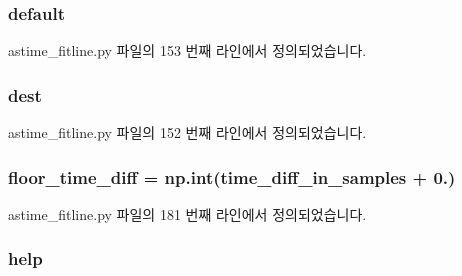 \subsubsection[{\texorpdfstring{default}{default}}]{\setlength{\rightskip}{0pt plus 5cm}default}\hypertarget{namespaceastime__fitline_affb1327b18bf08a379d19eef89cf1ed1}{}\label{namespaceastime__fitline_affb1327b18bf08a379d19eef89cf1ed1}


astime\+\_\+fitline.\+py 파일의 153 번째 라인에서 정의되었습니다.

\subsubsection[{\texorpdfstring{dest}{dest}}]{\setlength{\rightskip}{0pt plus 5cm}dest}\hypertarget{namespaceastime__fitline_ab0bede79c5f4cbed9c2cd932a0ace201}{}\label{namespaceastime__fitline_ab0bede79c5f4cbed9c2cd932a0ace201}


astime\+\_\+fitline.\+py 파일의 152 번째 라인에서 정의되었습니다.

\subsubsection[{\texorpdfstring{floor\+\_\+time\+\_\+diff}{floor_time_diff}}]{\setlength{\rightskip}{0pt plus 5cm}floor\+\_\+time\+\_\+diff = np.\+int({\bf time\+\_\+diff\+\_\+in\+\_\+samples} + 0.)}\hypertarget{namespaceastime__fitline_ab6f60fa8e275f766060bf2c45822113b}{}\label{namespaceastime__fitline_ab6f60fa8e275f766060bf2c45822113b}


astime\+\_\+fitline.\+py 파일의 181 번째 라인에서 정의되었습니다.

\subsubsection[{\texorpdfstring{help}{help}}]{\setlength{\rightskip}{0pt plus 5cm}help}\hypertarget{namespaceastime__fitline_a81ae9faedaa69e3e28e2960a0548df8d}{}\label{namespaceastime__fitline_a81ae9faedaa69e3e28e2960a0548df8d}


